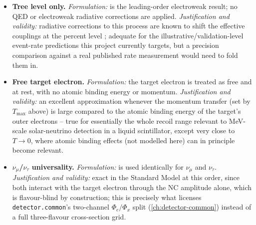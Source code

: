 \begin{notebox}
\begin{itemize}
  \item \textbf{Tree level only.} \emph{Formulation:} 
    is the leading-order electroweak result; no QED or electroweak
    radiative corrections are applied. \emph{Justification and validity:}
    radiative corrections to this process are known to shift the effective
    couplings at the percent level \parencite{BahcallKamionkowskiSirlin1995};
    adequate for the illustrative/validation-level event-rate predictions
    this project currently targets, but a precision comparison against a
    real published rate measurement would need to fold them in.
  \item \textbf{Free target electron.} \emph{Formulation:} the target
    electron is treated as free and at rest, with no atomic binding energy
    or momentum. \emph{Justification and validity:} an excellent
    approximation whenever the momentum transfer (set by $T_{\max}$ above)
    is large compared to the atomic binding energy of the target's outer
    electrons -- true for essentially the whole recoil range relevant to
    MeV-scale solar-neutrino detection in a liquid scintillator, except very
    close to $T\to0$, where atomic binding effects (not modelled here) can
    in principle become relevant.
  \item \textbf{$\nu_\mu$/$\nu_\tau$ universality.} \emph{Formulation:}
     is used identically for $\nu_\mu$ and
    $\nu_\tau$. \emph{Justification and validity:} exact in the Standard
    Model at this order, since both interact with the target electron
    through the NC amplitude alone, which is flavour-blind by construction;
    this is precisely what licenses \texttt{detector.common}'s two-channel
    $\Phi_e/\Phi_x$ split (\cref{ch:detector-common}) instead of a full
    three-flavour cross-section grid.
\end{itemize}
\end{notebox}
